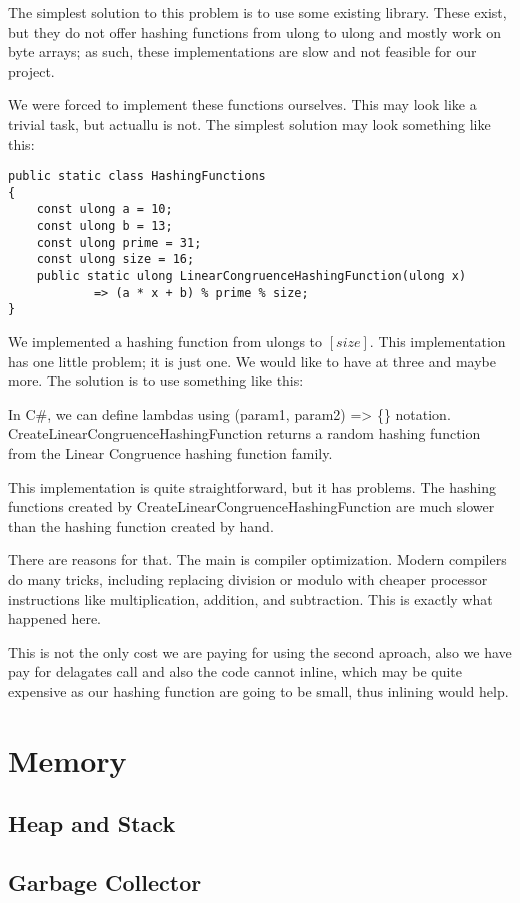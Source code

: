 The simplest solution to this problem is to use some existing library. These exist, but they do not offer hashing functions from ulong to ulong and mostly work on byte arrays; as such, these implementations are slow and not feasible for our project.

We were forced to implement these functions ourselves. This may look like a trivial task, but actuallu is not. The simplest solution may look something like this:
\begin{lstlisting}
public static class HashingFunctions
{
	const ulong a = 10;
	const ulong b = 13;
	const ulong prime = 31;
	const ulong size = 16;
	public static ulong LinearCongruenceHashingFunction(ulong x) 
            => (a * x + b) % prime % size;
}
\end{lstlisting}
We implemented a hashing function from ulongs to $[size]$. This implementation has one little problem; it is just one. We would like to have at three and maybe more. The solution is to use something like this:




In C\#, we can define lambdas using (param1, param2) => \{\}  notation. 
CreateLinearCongruenceHashingFunction returns a random hashing function from the Linear Congruence hashing function family. 

This implementation is quite straightforward, but it has problems. The hashing functions created by CreateLinearCongruenceHashingFunction are much slower than the hashing function created by hand. 

There are reasons for that. The main is compiler optimization. Modern compilers do many tricks, including replacing division or modulo with cheaper processor instructions like multiplication, addition, and subtraction. This is exactly what happened here.

This is not the only cost we are paying for using the second aproach, also we have pay for delagates call and also the code cannot inline, which may be quite expensive as our hashing function are going to be small, thus inlining would help.

\section{Memory}
\subsection{Heap and Stack}
\subsection{Garbage Collector}

